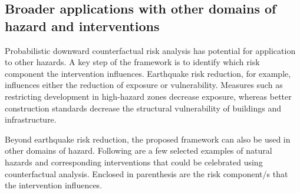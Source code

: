 \documentclass[utf8]{frontiersSCNS} %
\begin{document}
\subsection{Broader applications with other domains of hazard and interventions}

Probabilistic downward counterfactual risk analysis has potential for application to other hazards. A key step of the framework is to identify which risk component the intervention influences. Earthquake risk reduction, for example, influences either the reduction of exposure or vulnerability. Measures such as restricting development in high-hazard zones decrease exposure, whereas better construction standards decrease the structural vulnerability of buildings and infrastructure.

Beyond earthquake risk reduction, the proposed framework can also be used in other domains of hazard. Following are a few selected examples of natural hazards and corresponding interventions that could be celebrated using counterfactual analysis. Enclosed in parenthesis are the risk component/s that the intervention influences.
\end{document}
